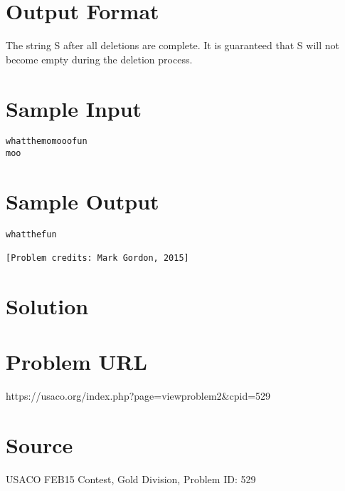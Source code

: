 \documentclass[12pt]{article}
\begin{document}
\section*{Output Format}
The string S after all deletions are complete.  It is guaranteed that S will not become empty during the deletion process.

\section*{Sample Input}
\begin{verbatim}
whatthemomooofun
moo
\end{verbatim}

\section*{Sample Output}
\begin{verbatim}
whatthefun

[Problem credits: Mark Gordon, 2015]
\end{verbatim}

\section*{Solution}


\section*{Problem URL}
https://usaco.org/index.php?page=viewproblem2&cpid=529

\section*{Source}
USACO FEB15 Contest, Gold Division, Problem ID: 529
\end{document}
